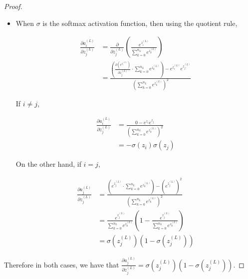 \documentclass{article}
\begin{document}
\begin{proof}
\begin{itemize}
            
            
                \item When $\sigma$ is the softmax activation function, then using the quotient rule,
                
                $$ \begin{aligned}
                \frac{\partial a^{(L)}_i}{\partial z^{(L)}_j}
                &= \frac{\partial}{\partial z^{(L)}_j} \left( \frac{e^{z^{(L)}_i}}{\sum_{k=0}^{n_L} e^{z^{(L)}_k}} \right) \\
                &= \frac{\left( \frac{\partial \left( e^{z^{(L)}_i}\right)}{\partial z^{(L)}_j} \cdot \sum_{k=0}^{n_L} e^{z^{(L)}_k} \right) - e^{z^{(L)}_i} e^{z^{(L)}_j}}{\left( \sum_{k=0}^{n_L} e^{z^{(L)}_k} \right)^2}
                \end{aligned} $$
                
                
                If $i \neq j$,
               
                $$ \begin{aligned}
                \frac{\partial a^{(L)}_i}{\partial z^{(L)}_j}
                &= \frac{0 - e^{z_i} e^{z_j}}{\left( \sum_{k=0}^{n_L} e^{z^{(L)}_k} \right)^2} \\
                &= - \sigma(z_i) \sigma(z_j)
                \end{aligned} $$
                
                On the other hand, if $i = j$,
                
                $$ \begin{aligned}
                \frac{\partial a^{(L)}_j}{\partial z^{(L)}_j}
                &= \frac{\left( e^{z^{(L)}_j} \cdot \sum_{k=0}^{n_L} e^{z^{(L)}_k} \right) - \left( e^{z^{(L)}_j} \right)^2}{\left( \sum_{k=0}^{n_L} e^{z^{(L)}_k} \right)^2} \\
                &= \frac{e^{z^{(L)}_j}}{\sum_{k=0}^{n_L} e^{z^{(L)}_k}} \left( 1 - \frac{e^{z^{(L)}_j}}{\sum_{k=0}^{n_L} e^{z^{(L)}_k}} \right) \\
                &= \sigma(z^{(L)}_j) \left( 1 - \sigma(z^{(L)}_j) \right)
                \end{aligned} $$
                
            \end{itemize}
            
            Therefore in both cases, we have that $\frac{\partial a^{(L)}_j}{\partial z^{(L)}_j} = \sigma(z^{(L)}_j) \left( 1 - \sigma(z^{(L)}_j) \right)$.
            

\end{proof}
\end{document}
